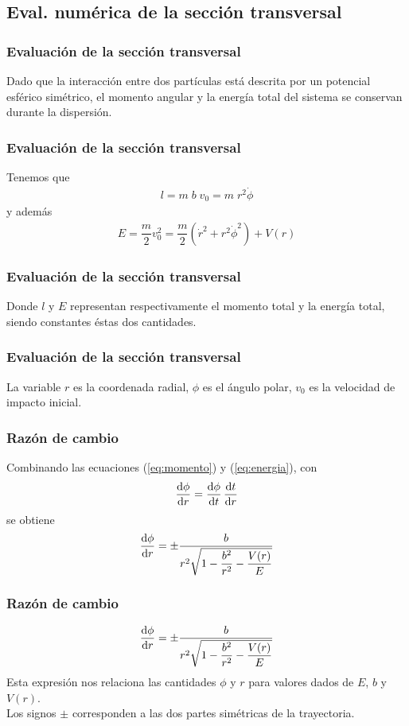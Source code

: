 \subsection{Eval. numérica de la sección transversal}
\begin{frame}
\frametitle{Evaluación de la sección transversal}
Dado que la interacción entre dos partículas está descrita por un potencial esférico simétrico, el momento angular y la energía total del sistema se conservan durante la dispersión.
\end{frame}
\begin{frame}
\frametitle{Evaluación de la sección transversal}
Tenemos que
\begin{align}
l = m \; b \; v_{0} = m \; r^{2} \dot{\phi}
\label{eq:momento}
\end{align}
y además
\begin{align}
E = \dfrac{m}{2} v_{0}^{2} = \dfrac{m}{2} \left( \dot{r}^{2} + r^{2} \dot{\phi}^{2} \right) + V(r)
\label{eq:energia}
\end{align}
\end{frame}
\begin{frame}
\frametitle{Evaluación de la sección transversal}
Donde $l$ y $E$ representan respectivamente el momento total y la energía total, siendo constantes éstas dos cantidades.
\end{frame}
\begin{frame}
\frametitle{Evaluación de la sección transversal}
La variable $r$ es la coordenada radial, $\phi$ es el ángulo polar, $v_{0}$ es la velocidad de impacto inicial.
\end{frame}
\begin{frame}
\frametitle{Razón de cambio}
Combinando las ecuaciones (\ref{eq:momento}) y (\ref{eq:energia}), con
\begin{align}
\dv{\phi}{r} = \dv{\phi}{t} \, \dv{t}{r}
\end{align}
\pause
se obtiene
\begin{align}
\dv{\phi}{r} = \pm \dfrac{b}{r^{2} \sqrt{1 - \dfrac{b^{2}}{r^{2}} - \dfrac{V(r)}{E}}}
\label{eq:dtheta_dr}
\end{align}
\end{frame}
\begin{frame}
\frametitle{Razón de cambio}
\begin{align*}
\dv{\phi}{r} = \pm \dfrac{b}{r^{2} \sqrt{1 - \dfrac{b^{2}}{r^{2}} - \dfrac{V(r)}{E}}}
\end{align*}
Esta expresión nos relaciona las cantidades $\phi$ y $r$ para valores dados de $E$, $b$ y $V(r)$. 
\\
\bigskip
Los signos $\pm$ corresponden a las dos partes simétricas de la trayectoria.
\end{frame}
